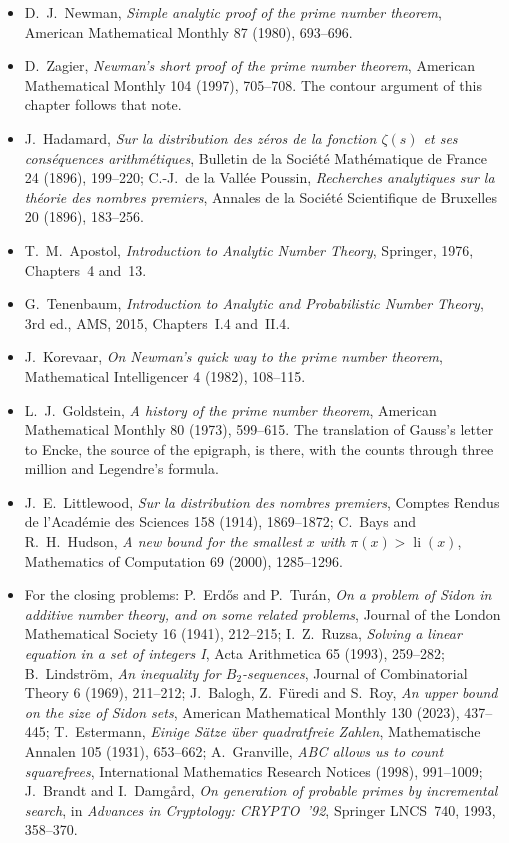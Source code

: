 \begin{itemize}
\item D.~J.~Newman, \emph{Simple analytic proof of the prime number theorem}, American Mathematical Monthly 87 (1980), 693--696.
\item D.~Zagier, \emph{Newman's short proof of the prime number theorem}, American Mathematical Monthly 104 (1997), 705--708. The contour argument of this chapter follows that note.
\item J.~Hadamard, \emph{Sur la distribution des zéros de la fonction $\zeta(s)$ et ses conséquences arithmétiques}, Bulletin de la Société Mathématique de France 24 (1896), 199--220;
C.-J.~de la Vallée Poussin, \emph{Recherches analytiques sur la théorie des nombres premiers}, Annales de la Société Scientifique de Bruxelles 20 (1896), 183--256.
\item T.~M.~Apostol, \emph{Introduction to Analytic Number Theory}, Springer, 1976, Chapters~4 and~13.
\item G.~Tenenbaum, \emph{Introduction to Analytic and Probabilistic Number Theory}, 3rd ed., AMS, 2015, Chapters~I.4 and~II.4.
\item J.~Korevaar, \emph{On Newman's quick way to the prime number theorem}, Mathematical Intelligencer 4 (1982), 108--115.
\item L.~J.~Goldstein, \emph{A history of the prime number theorem}, American Mathematical Monthly 80 (1973), 599--615. The translation of Gauss's letter to Encke, the source of the epigraph, is there, with the counts through three million and Legendre's formula.
\item J.~E.~Littlewood, \emph{Sur la distribution des nombres premiers}, Comptes Rendus de l'Académie des Sciences 158 (1914), 1869--1872; C.~Bays and R.~H.~Hudson, \emph{A new bound for the smallest $x$ with $\pi(x)>\operatorname{li}(x)$}, Mathematics of Computation 69 (2000), 1285--1296.
\item For the closing problems: P.~Erd\H os and P.~Tur\'an, \emph{On a problem of Sidon in additive number theory, and on some related problems}, Journal of the London Mathematical Society 16 (1941), 212--215; I.~Z.~Ruzsa, \emph{Solving a linear equation in a set of integers I}, Acta Arithmetica 65 (1993), 259--282; B.~Lindstr\"om, \emph{An inequality for $B_2$-sequences}, Journal of Combinatorial Theory 6 (1969), 211--212; J.~Balogh, Z.~F\"uredi and S.~Roy, \emph{An upper bound on the size of Sidon sets}, American Mathematical Monthly 130 (2023), 437--445;
T.~Estermann, \emph{Einige S\"atze \"uber quadratfreie Zahlen}, Mathematische Annalen 105 (1931), 653--662; A.~Granville, \emph{ABC allows us to count squarefrees}, International Mathematics Research Notices (1998), 991--1009; J.~Brandt and I.~Damg\aa rd, \emph{On generation of probable primes by incremental search}, in \emph{Advances in Cryptology: CRYPTO~'92}, Springer LNCS~740, 1993, 358--370.
\end{itemize}
